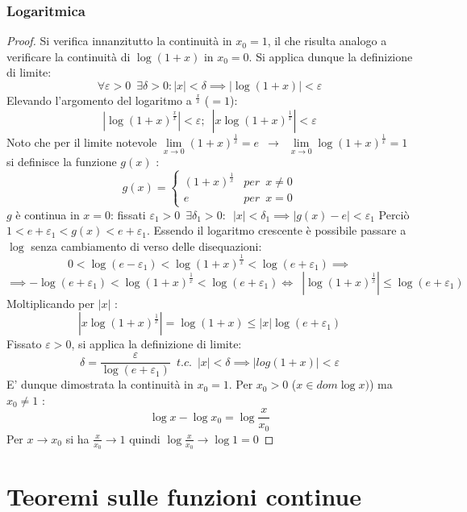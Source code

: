 \documentclass[10pt, oneside]{book}
\theoremstyle{plain}
\begin{document}
\subsubsection{Logaritmica}
\begin{proof}
Si verifica innanzitutto la continuità in $x_0 = 1$, il che risulta analogo a verificare la continuità di $\log (1+x)$ in $x_0 = 0$. Si applica dunque la definizione di limite:
\[\forall \varepsilon > 0 \enspace \exists \delta > 0 : |x| < \delta \implies |\log (1 + x)| < \varepsilon\]
Elevando l'argomento del logaritmo a $^{\frac{x}{x}}$ ($=1$):
\[|\log (1 + x)^{\frac{x}{x}}| < \varepsilon ; \enspace |x \log (1 + x)^{\frac{1}{x}}| < \varepsilon\]
Noto che per il limite notevole $\lim \limits_{x \rightarrow 0} (1 + x)^{\frac{1}{x}} = e \enspace \longrightarrow \enspace \lim \limits_{x \rightarrow 0} \log (1 + x)^{\frac{1}{x}} = 1$ si definisce la funzione $g(x)$ :
\[g(x) = \begin{cases}
  (1+x)^{\frac{1}{x}} &{per} \enspace x \neq 0 \\
  e &{per} \enspace x = 0
\end{cases}\]
$g$ è continua in $x = 0$: fissati $\varepsilon_1 > 0 \enspace \exists \delta_1 > 0 : \enspace |x| < \delta_1 \implies |g(x) - e| < \varepsilon_1$ \newline
Perciò $1 < e + \varepsilon_1 < g(x) < e + \varepsilon_1$. Essendo il logaritmo crescente è possibile passare a $\log$ senza cambiamento di verso delle disequazioni:
\[0 < \log(e - \varepsilon_1) < \log{(1+x)^{\frac{1}{x}}} < \log(e + \varepsilon_1) \implies\]
\[\implies -\log(e + \varepsilon_1) < \log{(1+x)^{\frac{1}{x}}} < \log(e + \varepsilon_1) \Leftrightarrow \enspace |\log{(1+x)^{\frac{1}{x}}}| \leq \log(e + \varepsilon_1)\]
Moltiplicando per $|x|$ :
\[|x\log{(1+x)^{\frac{1}{x}}}| = \log(1 + x) \leq |x| \log(e + \varepsilon_1)\]
Fissato $\varepsilon > 0$, si applica la definizione di limite:
\[\delta = \frac{\varepsilon}{\log(e + \varepsilon_1)} \enspace {t.c.} \enspace |x| < \delta \implies |log(1+x)| < \varepsilon\]
E' dunque dimostrata la continuità in $x_0 = 1$. Per $x_0 > 0$ ($x \in dom\log x)$) ma $x_0 \neq 1$ :
\[\log x - \log x_0 = \log \frac{x}{x_0}\]
Per $x \rightarrow x_0$ si ha $\displaystyle \frac{x}{x_0} \rightarrow 1$ quindi $\displaystyle \log \frac{x}{x_0} \rightarrow \log 1 = 0$
\end{proof}

\section{Teoremi sulle funzioni continue}
\end{document}
